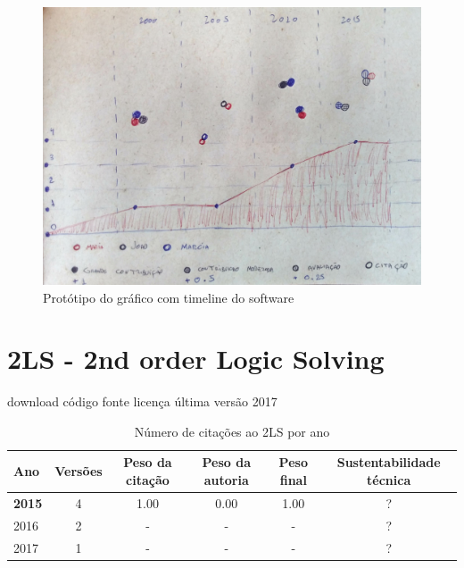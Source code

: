 
%

\label{softwares-summary}

\begin{figure}[h]
  \center
  \includegraphics[scale=0.35]{imagens/software-timeline-wireframe.jpg}
  \caption{Protótipo do gráfico com timeline do software}
\end{figure}

\section{2LS - 2nd order Logic Solving}
\checkmark download
\checkmark código fonte
\checkmark licença
\checkmark última versão 2017



\begin{table}[H]
\caption{Número de citações ao 2LS  por ano}
\centering
\begin{tabular}{| l | c | c | c | c | c |}
  \hline
  Ano & Versões & Peso da citação & Peso da autoria & Peso final & Sustentabilidade técnica \\
  \hline
            {\bf 2015}
          &
          4
          &
          1.00
          &
          0.00
          &
            {\color{blue} 1.00}
          &
          ?
          \\
\hline
        2016 & 2 & - & - & - & ? \\
\hline
        2017 & 1 & - & - & - & ? \\
\hline
\end{tabular}
\end{table}



